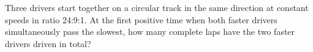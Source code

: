 Three drivers start together on a circular track in the same direction at constant speeds in ratio 24:9:1. At the first positive time when both faster drivers simultaneously pass the slowest, how many complete laps have the two faster drivers driven in total?
